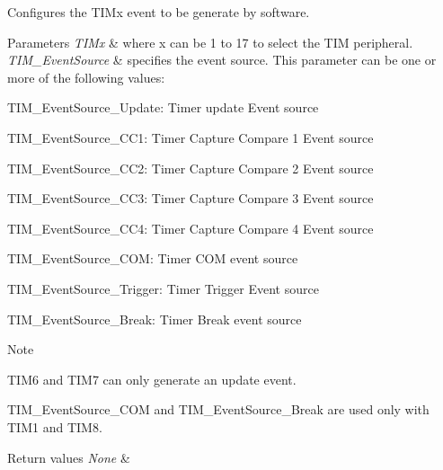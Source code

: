 Configures the T\+I\+Mx event to be generate by software. 


\begin{DoxyParams}{Parameters}
{\em T\+I\+Mx} & where x can be 1 to 17 to select the T\+IM peripheral. \\
\hline
{\em T\+I\+M\+\_\+\+Event\+Source} & specifies the event source. This parameter can be one or more of the following values\+:\\
\hline
\end{DoxyParams}
\begin{DoxyItemize}
\item T\+I\+M\+\_\+\+Event\+Source\+\_\+\+Update\+: Timer update Event source \item T\+I\+M\+\_\+\+Event\+Source\+\_\+\+C\+C1\+: Timer Capture Compare 1 Event source \item T\+I\+M\+\_\+\+Event\+Source\+\_\+\+C\+C2\+: Timer Capture Compare 2 Event source \item T\+I\+M\+\_\+\+Event\+Source\+\_\+\+C\+C3\+: Timer Capture Compare 3 Event source \item T\+I\+M\+\_\+\+Event\+Source\+\_\+\+C\+C4\+: Timer Capture Compare 4 Event source \item T\+I\+M\+\_\+\+Event\+Source\+\_\+\+C\+OM\+: Timer C\+OM event source\end{DoxyItemize}
\begin{DoxyItemize}
\item T\+I\+M\+\_\+\+Event\+Source\+\_\+\+Trigger\+: Timer Trigger Event source \item T\+I\+M\+\_\+\+Event\+Source\+\_\+\+Break\+: Timer Break event source \begin{DoxyNote}{Note}

\begin{DoxyItemize}
\item T\+I\+M6 and T\+I\+M7 can only generate an update event.
\item T\+I\+M\+\_\+\+Event\+Source\+\_\+\+C\+OM and T\+I\+M\+\_\+\+Event\+Source\+\_\+\+Break are used only with T\+I\+M1 and T\+I\+M8.
\end{DoxyItemize}
\end{DoxyNote}

\begin{DoxyRetVals}{Return values}
{\em None} & \\
\hline
\end{DoxyRetVals}
\end{DoxyItemize}
\mbox{\label{group___t_i_m___private___functions_ga29eb9f7151ceea94c3988539a5ee91cf}} 
